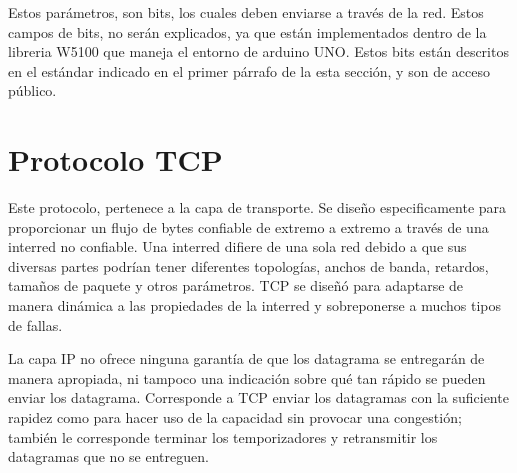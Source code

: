 Estos parámetros, son bits, los cuales deben enviarse a través de la red. Estos campos de bits, no serán explicados, ya que están implementados dentro de la libreria W5100 que maneja el entorno de arduino UNO. Estos bits están descritos en el estándar indicado en el primer párrafo de la esta sección, y son de acceso público. 


\section{Protocolo TCP } 
Este protocolo, pertenece a la capa de transporte. Se diseño especificamente para proporcionar un flujo de bytes confiable de extremo a extremo a través de una interred no confiable. Una interred difiere de una sola red debido a que sus diversas partes podrían tener diferentes topologías, anchos de banda, retardos, tamaños de paquete y otros parámetros. TCP se diseñó para adaptarse de manera dinámica a las propiedades de la interred y sobreponerse a muchos tipos de fallas.



La capa IP no ofrece ninguna garantía de que los datagrama se entregarán de manera apropiada, ni tampoco una indicación sobre qué tan rápido se pueden enviar los datagrama. Corresponde a TCP enviar los datagramas con la suficiente rapidez como para hacer uso de la capacidad sin provocar una congestión; también le corresponde terminar los temporizadores y retransmitir los datagramas que no se entreguen. 

